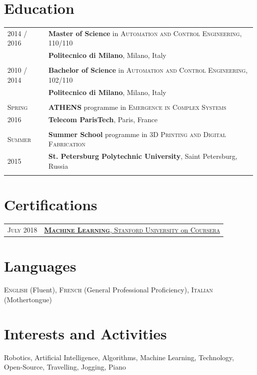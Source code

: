 \documentclass[a4paper,10pt]{article}
\begin{document}
	\section{Education}
		\begin{tabular}{p{2cm}|p{13.8cm}}
			\centering\textsc{2014 / 2016} & \textbf{Master of Science} in \textsc{Automation and Control Engineering}, \hfill \textsc{110/110} \\ 
			&\textbf{Politecnico di Milano}, Milano, Italy\\
			&\\

			\noindent\textsc{2010 / 2014} & \textbf{Bachelor of Science} in \noindent
			\textsc{Automation and Control Engineering}, \hfill \textsc{102/110} \\
			& \textbf{Politecnico di Milano}, Milano, Italy\\
			&\\

			\centering\textsc{Spring} & \textbf{ATHENS} programme in \textsc{Emergence in Complex Systems}\\
			\centering\textsc{2016}& 
			\textbf{Telecom ParisTech}, Paris, France\\
			&\\

			\centering\textsc{Summer} & \textbf{Summer School} programme in \textsc{3D Printing and Digital Fabrication}\\
			\centering\textsc{2015}& 
			\textbf{St. Petersburg Polytechnic University}, Saint Petersburg, Russia\\
			&\\
		\end{tabular}

	\section{Certifications}
	\begin{tabular}{p{2cm}|p{13.8cm}}
		\centering\textsc{July 2018} &
		\href{https://www.coursera.org/account/accomplishments/verify/PHU5XX9EQ5LP}{\textbf{\textsc{Machine Learning}}, \textsc{Stanford University} on \textsc{Coursera}} \\
	\end{tabular}

	\section{Languages}
	\textsc{English} (Fluent), \textsc{French} (General Professional Proficiency), \textsc{Italian} (Mothertongue)

	\section{Interests and Activities}
	Robotics, Artificial Intelligence, Algorithms, Machine Learning, Technology, Open-Source, Travelling, Jogging, Piano\\
\end{document}
